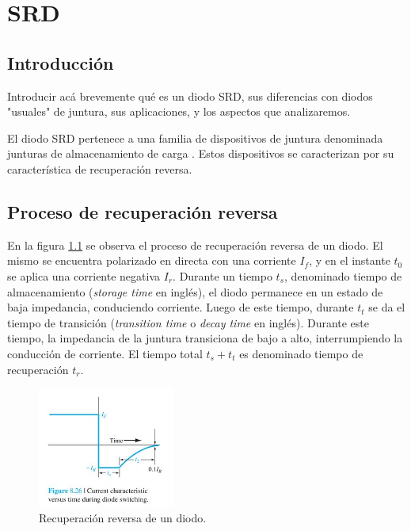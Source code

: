 \chapter{SRD}

\section{Introducción}

Introducir acá brevemente qué es un diodo SRD, sus diferencias con diodos
"usuales" de juntura, sus aplicaciones, y los aspectos que analizaremos.

El diodo SRD pertenece a una familia de dispositivos de juntura denominada
junturas de almacenamiento de carga \cite{moll1962}. Estos dispositivos se
caracterizan por su característica de recuperación reversa.

\section{Proceso de recuperación reversa}

En la figura \ref{fig:diode_reverse_recovery} se observa el proceso de recuperación reversa de un diodo. El mismo
se encuentra polarizado en directa con una corriente $I_f$, y en el instante
$t_0$ se aplica una corriente negativa $I_r$. Durante un tiempo $t_s$,
denominado tiempo de almacenamiento (\textit{storage time} en inglés), el diodo
permanece en un estado de baja impedancia, conduciendo corriente. Luego de este
tiempo, durante $t_t$ se da el tiempo de transición (\textit{transition time} o
\textit{decay time} en inglés). Durante este tiempo, la impedancia de la juntura
transiciona de bajo a alto, interrumpiendo la conducción de corriente. El tiempo
total $t_s+t_t$ es denominado tiempo de recuperación $t_r$.

\begin{figure}[t]
  \centering
    \includegraphics[width=0.4\textwidth]{images/diode_reverse_recovery.jpeg}
    \caption{Recuperación reversa de un diodo.}
    \label{fig:diode_reverse_recovery}
\end{figure}

